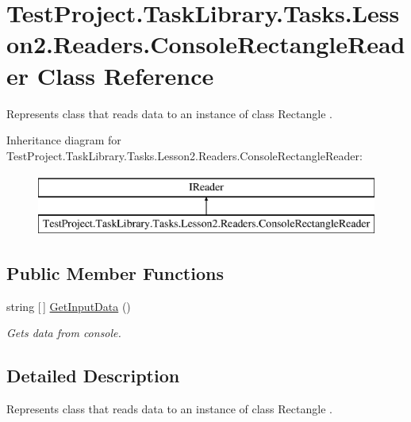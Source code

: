 \hypertarget{class_test_project_1_1_task_library_1_1_tasks_1_1_lesson2_1_1_readers_1_1_console_rectangle_reader}{}\section{Test\+Project.\+Task\+Library.\+Tasks.\+Lesson2.\+Readers.\+Console\+Rectangle\+Reader Class Reference}
\label{class_test_project_1_1_task_library_1_1_tasks_1_1_lesson2_1_1_readers_1_1_console_rectangle_reader}


Represents class that reads data to an instance of class Rectangle .  


Inheritance diagram for Test\+Project.\+Task\+Library.\+Tasks.\+Lesson2.\+Readers.\+Console\+Rectangle\+Reader\+:\begin{figure}[H]
\begin{center}
\leavevmode
\includegraphics[height=2.000000cm]{class_test_project_1_1_task_library_1_1_tasks_1_1_lesson2_1_1_readers_1_1_console_rectangle_reader}
\end{center}
\end{figure}
\subsection*{Public Member Functions}
\begin{DoxyCompactItemize}
\item 
string \mbox{[}$\,$\mbox{]} \mbox{\hyperlink{class_test_project_1_1_task_library_1_1_tasks_1_1_lesson2_1_1_readers_1_1_console_rectangle_reader_acb84c685cd0a7919589846ee002885af}{Get\+Input\+Data}} ()
\begin{DoxyCompactList}\small\item\em Gets data from console. \end{DoxyCompactList}\end{DoxyCompactItemize}


\subsection{Detailed Description}
Represents class that reads data to an instance of class Rectangle . 



